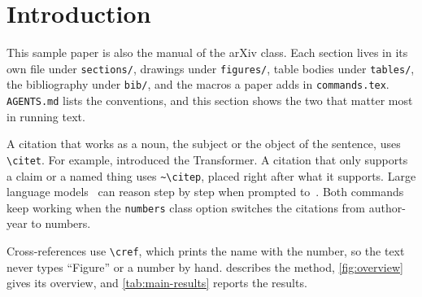 \section{Introduction}
\label{sec:introduction}

This sample paper is also the manual of the \labname{} arXiv class.
Each section lives in its own file under \texttt{sections/}, drawings under \texttt{figures/}, table bodies under \texttt{tables/}, the bibliography under \texttt{bib/}, and the macros a paper adds in \texttt{commands.tex}.
\texttt{AGENTS.md} lists the conventions, and this section shows the two that matter most in running text.

A citation that works as a noun, the subject or the object of the sentence, uses \verb|\citet|.
For example, \citet{vaswani2017attention} introduced the Transformer.
A citation that only supports a claim or a named thing uses \verb|~\citep|, placed right after what it supports.
Large language models~\citep{brown2020language} can reason step by step when prompted to~\citep{wei2022chain}.
Both commands keep working when the \texttt{numbers} class option switches the citations from author-year to numbers.

Cross-references use \verb|\cref|, which prints the name with the number, so the text never types ``Figure'' or a number by hand.
 describes the method, \cref{fig:overview} gives its overview, and \cref{tab:main-results} reports the results.
